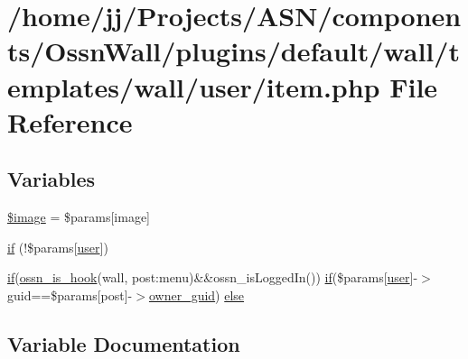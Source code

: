 \hypertarget{components_2_ossn_wall_2plugins_2default_2wall_2templates_2wall_2user_2item_8php}{}\section{/home/jj/\+Projects/\+A\+S\+N/components/\+Ossn\+Wall/plugins/default/wall/templates/wall/user/item.php File Reference}
\label{components_2_ossn_wall_2plugins_2default_2wall_2templates_2wall_2user_2item_8php}
\subsection*{Variables}
\begin{DoxyCompactItemize}
\item 
\hyperlink{components_2_ossn_wall_2plugins_2default_2wall_2templates_2wall_2user_2item_8php_aac6146b4cdec66c94263ddb55afd5946}{\$image} = \$params\mbox{[}\textquotesingle{}image\textquotesingle{}\mbox{]}
\item 
\hyperlink{components_2_ossn_wall_2plugins_2default_2wall_2templates_2wall_2user_2item_8php_a90bdcd071e999f799c3bb0f4daa51691}{if} (!\$params\mbox{[}\textquotesingle{}\hyperlink{ossn_8config_8db_8example_8php_a802544b7ba9f79bbf24ef67773d53bed}{user}\textquotesingle{}\mbox{]})
\item 
\hyperlink{jquery_8tokeninput_8js_ad8dd46a3cbc004569e34401e9e71771a}{if}(\hyperlink{ossn_8lib_8system_8php_ae29c30c131d7600928d7a2fc28bcd322}{ossn\+\_\+is\+\_\+hook}(\textquotesingle{}wall\textquotesingle{}, \textquotesingle{}post\+:menu\textquotesingle{})\&\&ossn\+\_\+is\+Logged\+In()) \hyperlink{jquery_8tokeninput_8js_ad8dd46a3cbc004569e34401e9e71771a}{if}(\$params\mbox{[}\textquotesingle{}\hyperlink{ossn_8config_8db_8example_8php_a802544b7ba9f79bbf24ef67773d53bed}{user}\textquotesingle{}\mbox{]}-\/$>$guid==\$params\mbox{[}\textquotesingle{}post\textquotesingle{}\mbox{]}-\/$>$\hyperlink{user_8php_a307051fefc937afd02c509c55646f50b}{owner\+\_\+guid}) \hyperlink{components_2_ossn_wall_2plugins_2default_2wall_2templates_2wall_2user_2item_8php_a455b1f9c77db61838a93b44445ad7413}{else}
\end{DoxyCompactItemize}


\subsection{Variable Documentation}
